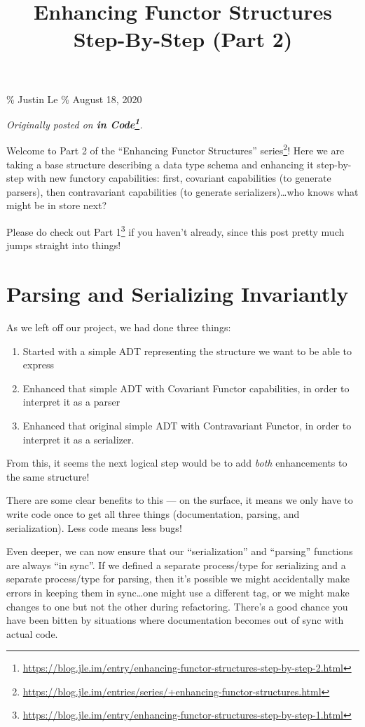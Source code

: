 \documentclass[]{article}
\title{Enhancing Functor Structures Step-By-Step (Part 2)}
\renewcommand{\href}[2]{#2\footnote{\url{#1}}}
\begin{document}
\maketitle

\% Justin Le \% August 18, 2020

\emph{Originally posted on
\textbf{\href{https://blog.jle.im/entry/enhancing-functor-structures-step-by-step-2.html}{in
Code}}.}

Welcome to Part 2 of the
\href{https://blog.jle.im/entries/series/+enhancing-functor-structures.html}{``Enhancing
Functor Structures'' series}! Here we are taking a base structure describing a
data type schema and enhancing it step-by-step with new functory capabilities:
first, covariant capabilities (to generate parsers), then contravariant
capabilities (to generate serializers)\ldots who knows what might be in store
next?

Please do check out
\href{https://blog.jle.im/entry/enhancing-functor-structures-step-by-step-1.html}{Part
1} if you haven't already, since this post pretty much jumps straight into
things!

\section{Parsing and Serializing
Invariantly}\label{parsing-and-serializing-invariantly}

As we left off our project, we had done three things:

\begin{enumerate}
\def\labelenumi{\arabic{enumi}.}
\tightlist
\item
  Started with a simple ADT representing the structure we want to be able to
  express
\item
  Enhanced that simple ADT with Covariant Functor capabilities, in order to
  interpret it as a parser
\item
  Enhanced that original simple ADT with Contravariant Functor, in order to
  interpret it as a serializer.
\end{enumerate}

From this, it seems the next logical step would be to add \emph{both}
enhancements to the same structure!

There are some clear benefits to this --- on the surface, it means we only have
to write code once to get all three things (documentation, parsing, and
serialization). Less code means less bugs!

Even deeper, we can now ensure that our ``serialization'' and ``parsing''
functions are always ``in sync''. If we defined a separate process/type for
serializing and a separate process/type for parsing, then it's possible we might
accidentally make errors in keeping them in sync\ldots one might use a different
tag, or we might make changes to one but not the other during refactoring.
There's a good chance you have been bitten by situations where documentation
becomes out of sync with actual code.
\end{document}
